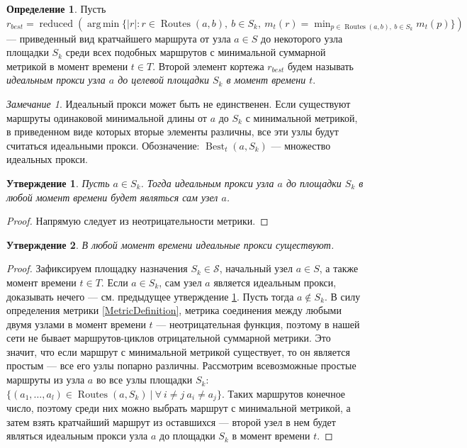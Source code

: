 \documentclass{article}
\theoremstyle{plain}
\theoremstyle{plain}
\theoremstyle{plain}
\theoremstyle{plain}
\newtheorem{claim}{Утверждение}[section]
\theoremstyle{definition}
\newtheorem{definition}{Определение}[section]
\theoremstyle{remark}
\newtheorem{remark}{Замечание}[section]
\theoremstyle{plain}
\DeclareMathOperator*{\argmin}{arg\,min}
\DeclareMathOperator*{\best}{Best}
\DeclareMathOperator*{\routes}{Routes}
\DeclareMathOperator*{\reduced}{reduced}
\begin{document}
\begin{definition}
\label{IdealProxyDefinition}
    Пусть $r_{best} = \reduced( \argmin \{ |r| : r \in \routes(a,b),\ b \in S_k,\ m_t(r) = \displaystyle \min_{p \in \routes(a,b),\ b \in S_k} m_t(p) \} )$ --- приведенный вид кратчайшего маршрута от узла $a \in S$ до некоторого узла площадки $S_k$ среди всех подобных маршрутов с минимальной суммарной метрикой в момент времени $t \in T$. Второй элемент кортежа $r_{best}$ будем называть \textit{идеальным прокси узла $a$ до целевой площадки $S_k$ в момент времени $t$}.
\end{definition}

\begin{remark}
    Идеальный прокси может быть не единственен. Если существуют маршруты одинаковой минимальной длины от $a$ до $S_k$ с минимальной метрикой, в приведенном виде которых вторые элементы различны, все эти узлы будут считаться идеальными прокси. Обозначение: $\best_t(a, S_k)$ --- множество идеальных прокси.
\end{remark}

\begin{claim}
\label{SelfProxy}
    Пусть $a \in S_k$. Тогда идеальным прокси узла $a$ до площадки $S_k$ в любой момент времени будет являться сам узел $a$.
\end{claim}
\begin{proof}
    Напрямую следует из неотрицательности метрики.
\end{proof}

\begin{claim}
\label{IdealProxyExistance}
    В любой момент времени идеальные прокси существуют.
\end{claim}
\begin{proof}
    Зафиксируем площадку назначения $S_k \in \mathcal{S}$, начальный узел $a \in S$, а также момент времени $t \in T$. Если $a \in S_k$, сам узел $a$ является идеальным прокси, доказывать нечего --- см. предыдущее утверждение \ref{SelfProxy}. Пусть тогда $a \notin S_k$. В силу определения метрики \ref{MetricDefinition}, метрика соединения между любыми двумя узлами в момент времени $t$ --- неотрицательная функция, поэтому в нашей сети не бывает маршрутов-циклов отрицательной суммарной метрики. Это значит, что если маршрут с минимальной метрикой существует, то он является простым --- все его узлы попарно различны. Рассмотрим всевозможные простые маршруты из узла $a$ во все узлы площадки $S_k$: $\{(a_1, \ldots, a_l) \in \routes(a, S_k)\ |\ \forall\ i \neq j\ a_i \neq a_j\}$. Таких маршрутов конечное число, поэтому среди них можно выбрать маршрут с минимальной метрикой, а затем взять кратчайший маршрут из оставшихся --- второй узел в нем будет являться идеальным прокси узла $a$ до площадки $S_k$ в момент времени $t$.
\end{proof}
\end{document}
